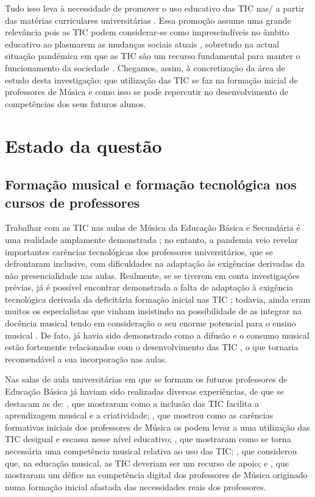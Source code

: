 \documentclass{textolivre}
\begin{document}
Tudo isso leva à necessidade de promover o uso educativo das TIC nas/ a partir
das matérias curriculares universitárias \cite{castaneda2019}. Essa promoção
assume uma grande relevância pois as TIC podem considerar-se como
imprescindíveis no âmbito educativo ao plasmarem as mudanças sociais atuais
\cite{dezlatorre2018}, sobretudo na actual situação pandémica em que as TIC são um
recurso fundamental para manter o funcionamento da sociedade \cite{beltran2020}. 
Chegamos, assim, à concretização da área de estudo desta investigação:
que utilização das TIC se faz na formação inicial de professores de Música e
como isso se pode repercutir no desenvolvimento de competências dos seus
futuros alunos.



\section{Estado da questão}\label{sec-estado}
\subsection{Formação musical e formação tecnológica nos cursos de professores}\label{sec-formacao}
Trabalhar com as TIC nas aulas de Música da Educação Básica e Secundária é uma
realidade amplamente demonstrada \cite{martin1992,tejadaGimnez2004,castanon2012,vargas,padula2016,espigares2018,perezdiaz2019};
no entanto, a pandemia veio revelar importantes
carências tecnológicas dos professores universitários, que se defrontaram
inclusive, com dificuldades na adaptação às exigências derivadas da não
presencialidade nas aulas. Realmente, se se tiverem em conta investigações
prévias, já é possível encontrar demonstrada a falta de adaptação à exigência
tecnológica derivada da deficitária formação inicial nas TIC \cite{vaquer2012,dezlatorre2018};
todavia, ainda eram muitos os especialistas que
vinham insistindo na possibilidade de as integrar na docência musical
\cite{tourinan2018} tendo em consideração o seu enorme potencial para o ensino
musical \cite{colasbravo2014}. De fato, já havia sido
demonstrado como a difusão e o consumo musical estão fortemente relacionados
com o desenvolvimento das TIC \cite{cozargutirrez2015}, o
que tornaria recomendável a sua incorporação nas aulas.

Nas salas de aula universitárias em que se formam os futuros professores de
Educação Básica já haviam sido realizadas diversas experiências, de que se
destacam as de: \textcite{galera2011}, que mostraram como a inclusão das TIC
facilita a aprendizagem musical e a criatividade; \textcite{dezlatorre2018}, que mostrou como
as carências formativas iniciais dos professores de Música os podem levar a uma
utilização das TIC desigual e escassa nesse nível educativo; \textcite{cozargutirrez2015}, 
que mostraram como se torna necessária uma
competência musical relativa ao uso das TIC; \textcite{palazonherrera2016}, que
considerou que, na educação musical, as TIC deveriam ser um recurso de apoio; e
\textcite{loresgomez2019}, que mostraram um défice na competência digital
dos professores de Música originado numa formação inicial afastada das
necessidades reais dos professores.
\end{document}

